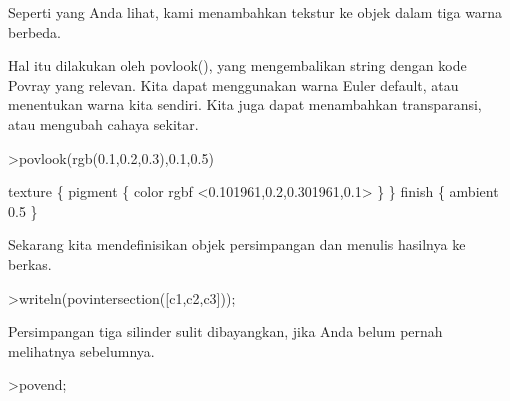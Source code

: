 \documentclass[a4paper,10pt]{article}
\begin{document}
\begin{eulernotebook}
\begin{eulercomment}
\begin{eulercomment}
\begin{eulercomment}
\begin{eulercomment}
\begin{eulercomment}
\begin{eulercomment}
\begin{eulercomment}
\begin{eulercomment}
\begin{eulercomment}
\begin{eulercomment}
\begin{eulercomment}
\begin{eulercomment}
\begin{eulercomment}
\begin{eulercomment}
\begin{eulercomment}
\begin{eulercomment}
\begin{eulercomment}
\begin{eulercomment}
\begin{eulercomment}
\begin{eulercomment}
\begin{eulercomment}
\begin{eulercomment}
\begin{eulercomment}
\begin{eulercomment}
\begin{eulercomment}
\begin{eulercomment}
\begin{eulercomment}
\begin{eulercomment}
\begin{eulercomment}
\begin{eulercomment}
\begin{eulercomment}
\begin{eulercomment}
\begin{eulercomment}
\begin{eulercomment}
\begin{eulercomment}
\begin{eulercomment}
\begin{eulercomment}
\begin{eulercomment}
\begin{eulercomment}
\begin{eulercomment}
\begin{eulercomment}
Seperti yang Anda lihat, kami menambahkan tekstur ke objek dalam tiga
warna berbeda.

Hal itu dilakukan oleh povlook(), yang mengembalikan string dengan
kode Povray yang relevan. Kita dapat menggunakan warna Euler default,
atau menentukan warna kita sendiri. Kita juga dapat menambahkan
transparansi, atau mengubah cahaya sekitar.
\end{eulercomment}
\begin{eulerprompt}
>povlook(rgb(0.1,0.2,0.3),0.1,0.5)
\end{eulerprompt}
\begin{euleroutput}
   texture \{ pigment \{ color rgbf <0.101961,0.2,0.301961,0.1> \}  \} 
   finish \{ ambient 0.5 \} 
  
\end{euleroutput}
\begin{eulercomment}
Sekarang kita mendefinisikan objek persimpangan dan menulis hasilnya
ke berkas.
\end{eulercomment}
\begin{eulerprompt}
>writeln(povintersection([c1,c2,c3]));
\end{eulerprompt}
\begin{eulercomment}
Persimpangan tiga silinder sulit dibayangkan, jika Anda belum pernah
melihatnya sebelumnya.
\end{eulercomment}
\begin{eulerprompt}
>povend;
\end{eulerprompt}

\end{eulercomment}
\end{eulercomment}
\end{eulercomment}
\end{eulercomment}
\end{eulercomment}
\end{eulercomment}
\end{eulercomment}
\end{eulercomment}
\end{eulercomment}
\end{eulercomment}
\end{eulercomment}
\end{eulercomment}
\end{eulercomment}
\end{eulercomment}
\end{eulercomment}
\end{eulercomment}
\end{eulercomment}
\end{eulercomment}
\end{eulercomment}
\end{eulercomment}
\end{eulercomment}
\end{eulercomment}
\end{eulercomment}
\end{eulercomment}
\end{eulercomment}
\end{eulercomment}
\end{eulercomment}
\end{eulercomment}
\end{eulercomment}
\end{eulercomment}
\end{eulercomment}
\end{eulercomment}
\end{eulercomment}
\end{eulercomment}
\end{eulercomment}
\end{eulercomment}
\end{eulercomment}
\end{eulercomment}
\end{eulercomment}
\end{eulercomment}
\end{eulernotebook}
\end{document}
